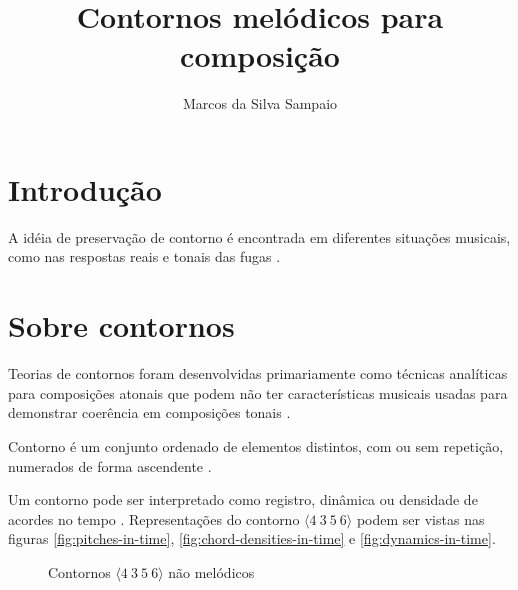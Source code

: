\documentclass[12pt,brazil]{book}
\title{Contornos melódicos para composição}
\author{Marcos da Silva Sampaio}
\newcommand{\contorno}[1]{$\langle #1 \rangle$}
\begin{document}
\maketitle
\tableofcontents
\listoftables
\listoffigures

\chapter{Introdução}
\label{cha:introducao}

A idéia de preservação de contorno é encontrada em diferentes
situações musicais, como nas respostas reais e tonais das fugas
\cite[p. 29]{morris87:composition}.

\chapter{Sobre contornos}
\label{cha:sobre-contornos}



Teorias de contornos foram desenvolvidas primariamente como técnicas
analíticas para composições atonais que podem não ter características
musicais usadas para demonstrar coerência em composições tonais
\cite[p. 1]{beard03:contour}.

Contorno é um conjunto ordenado de elementos distintos, com ou sem
repetição, numerados de forma ascendente
\cite[p. 206]{morris93:directions}.

Um contorno pode ser interpretado como registro, dinâmica ou densidade
de acordes no tempo \cite[p. 206]{morris93:directions}
\cite[p. 22]{clifford95:contour}. Representações do contorno
\contorno{4\:3\:5\:6} podem ser vistas nas figuras
\ref{fig:pitches-in-time}, \ref{fig:chord-densities-in-time} e
\ref{fig:dynamics-in-time}.

\begin{figure}
  \centering

  \hspace{.25in}


  \hspace{.25in}


  \caption{Contornos \contorno{4\:3\:5\:6} não melódicos}
  \label{fig:non-melodic-contours}
\end{figure}
\end{document}
